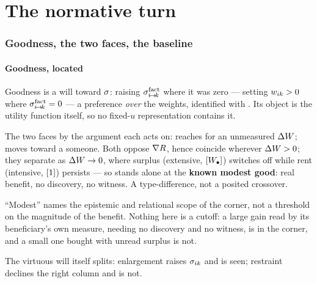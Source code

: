\documentclass[../main]{subfiles}
\begin{document}
\clearpage
\part{The normative turn}

\section{Goodness, the two faces, the baseline}
\label{sec:goodness}

\subsection{Goodness, located}
\label{subsec:good:located}
%
Goodness is a will toward $\sigma$: raising $\sigma\sp{\mathrm{fact}}\sb{ i\!\to\!k }$ where it was zero ---
setting $w\sb{ ik }>0$ where $\sigma\sp{\mathrm{fact}}\sb{ i\!\to\!k }=0$ --- a preference \emph{over} the
weights, identified with . Its object is the utility function itself, so no
fixed-$u$ representation contains it.

The two faces  by the argument each acts on:  reaches for an unmeasured
$\Delta W$;  moves toward a someone. Both oppose $\nabla R$, hence
coincide wherever $\Delta W>0$; they separate as $\Delta W\to0$, where surplus (extensive,
$[W\sb{\bullet}]$) switches off while rent (intensive, $[1]$) persists --- so 
stands alone at the \textbf{known modest good}: real benefit, no discovery, no witness. A
type-difference, not a posited crossover.


``Modest'' names the epistemic and relational scope of the corner, not a threshold on the
magnitude of the benefit. Nothing here is a cutoff: a large gain read by its beneficiary's
own measure, needing no discovery and no witness, is in the corner, and a small one bought
with unread surplus is not.

The virtuous will itself splits:  enlargement raises $\sigma\sb{ ik }$ and is seen;
 restraint declines the right column and is not.
\end{document}

